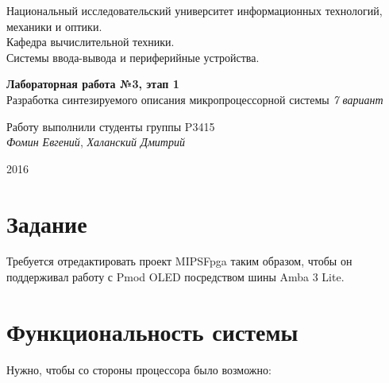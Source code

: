 \documentclass[12pt, a4paper] {ncc}
\begin{document}
\setcounter{figure}{0}
\frenchspacing
\pagestyle{empty}
\begin{center}
     Национальный исследовательский университет информационных технологий,
                              механики и оптики.\\
                       Кафедра вычислительной техники.\\
                Системы ввода-вывода и периферийные устройства.
\end{center}
\begin{center}
                         {\bf Лабораторная работа №3, этап 1}\\
          Разработка синтезируемого описания микропроцессорной системы
                                {\sl 7 вариант}
\end{center}
\begin{flushright}
                                        Работу выполнили студенты группы P3415\\
                                                            {\it Фомин Евгений},
                                                         {\it Халанский Дмитрий}
\end{flushright}
\begin{center}
                                      2016
\end{center}
\newpage

\pagestyle{plain}

\tableofcontents

\section{Задание}

Требуется отредактировать проект MIPSFpga таким образом, чтобы он поддерживал
работу с Pmod OLED посредством шины Amba 3 Lite.

\section{Функциональность системы}

Нужно, чтобы со стороны процессора было возможно:
\end{document}
